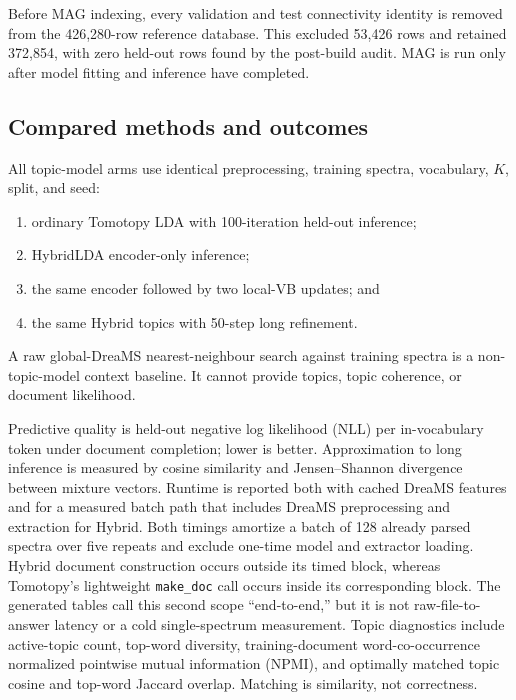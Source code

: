 \documentclass[11pt]{article}
\newcommand{\code}[1]{\texttt{#1}}
\begin{document}
Before MAG indexing, every validation and test connectivity identity is
removed from the 426,280-row reference database. This excluded 53,426 rows and
retained 372,854, with zero held-out rows found by the post-build audit. MAG is
run only after model fitting and inference have completed.

\subsection{Compared methods and outcomes}

All topic-model arms use identical preprocessing, training spectra,
vocabulary, $K$, split, and seed:
\begin{enumerate}
  \item ordinary Tomotopy LDA with 100-iteration held-out inference;
  \item HybridLDA encoder-only inference;
  \item the same encoder followed by two local-VB updates; and
  \item the same Hybrid topics with 50-step long refinement.
\end{enumerate}
A raw global-DreaMS nearest-neighbour search against training spectra is a
non-topic-model context baseline. It cannot provide topics, topic coherence, or
document likelihood.

Predictive quality is held-out negative log likelihood (NLL) per
in-vocabulary token under document completion; lower is better. Approximation
to long inference is measured by cosine similarity and Jensen--Shannon
divergence between mixture vectors. Runtime is reported both with cached DreaMS
features and for a measured batch path that includes DreaMS preprocessing and
extraction for Hybrid. Both timings amortize a batch of 128 already parsed
spectra over five repeats and exclude one-time model and extractor loading.
Hybrid document construction occurs outside its timed block, whereas
Tomotopy's lightweight \code{make\_doc} call occurs inside its corresponding
block. The generated tables call this second scope ``end-to-end,'' but it is
not raw-file-to-answer latency or a cold single-spectrum measurement. Topic
diagnostics include active-topic count, top-word diversity,
training-document word-co-occurrence normalized pointwise mutual information
(NPMI), and optimally matched topic cosine and top-word Jaccard overlap.
Matching is similarity, not correctness.
\end{document}
